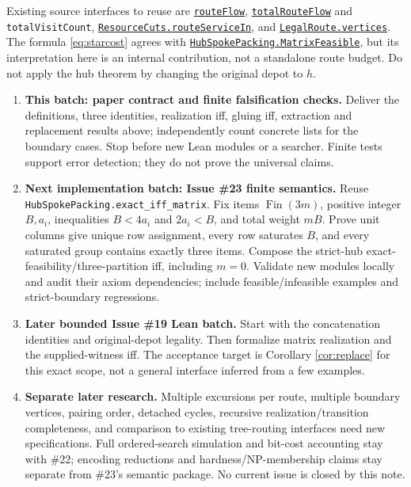 \documentclass[11pt]{article}
\theoremstyle{remark}
\newcommand{\code}[1]{\nolinkurl{#1}}
\newcommand{\src}[2]{\href{https://github.com/huam54925-cpu/uav-routing-certification/blob/135cdef388c4d091aac78c9dd41cefddd57f202e/LeanCompletion/UAV/#1.lean}{#2}}
\begin{document}
Existing source interfaces to reuse are
\src{Flow}{\code{routeFlow}},
\src{TotalFlow}{\code{totalRouteFlow}} and \code{totalVisitCount},
\src{ResourceCuts}{\code{ResourceCuts.routeServiceIn}}, and
\src{RouteToFlow}{\code{LegalRoute.vertices}}.
The formula \eqref{eq:starcost} agrees with
\src{HubSpokePacking}{\code{HubSpokePacking.MatrixFeasible}}, but its
interpretation here is an internal contribution, not a standalone route
budget. Do not apply the hub theorem by changing the original depot to $h$.

\begin{enumerate}
 \item \textbf{This batch: paper contract and finite falsification checks.}
 Deliver the definitions, three identities, realization iff, gluing iff,
 extraction and replacement results above; independently count concrete
 lists for the boundary cases. Stop before new Lean modules or a searcher.
 Finite tests support error detection; they do not prove the universal claims.
 \item \textbf{Next implementation batch: Issue \#23 finite semantics.}
 Reuse \code{HubSpokePacking.exact_iff_matrix}. Fix items
 $\operatorname{Fin}(3m)$, positive integer $B,a_i$, inequalities
 $B<4a_i$ and $2a_i<B$, and total weight $mB$.
 Prove unit columns give unique row assignment, every row saturates $B$,
 and every saturated group contains exactly three items. Compose the
 strict-hub exact-feasibility/three-partition iff, including $m=0$.
 Validate new modules locally and audit their axiom dependencies; include
 feasible/infeasible examples and strict-boundary regressions.
 \item \textbf{Later bounded Issue \#19 Lean batch.}
 Start with the concatenation identities and original-depot legality.
 Then formalize matrix realization and the supplied-witness iff. The
 acceptance target is Corollary \ref{cor:replace} for this exact scope,
 not a general interface inferred from a few examples.
 \item \textbf{Separate later research.}
 Multiple excursions per route, multiple boundary vertices, pairing order,
 detached cycles, recursive realization/transition completeness, and
 comparison to existing tree-routing interfaces need new specifications.
 Full ordered-search simulation and bit-cost accounting stay with \#22;
 encoding reductions and hardness/NP-membership claims stay separate from
 \#23's semantic package. No current issue is closed by this note.
\end{enumerate}
\end{document}
